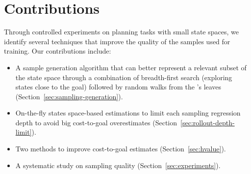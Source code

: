 \section{Contributions}
\label{sec:contributions}

Through controlled experiments on planning tasks with small state spaces, we identify several techniques that improve the quality of the samples used for training. Our contributions include:

\begin{itemize}
    \item A sample generation algorithm that can better represent a relevant subset of the state space through a combination of breadth-first search (exploring states close to the goal) followed by random walks from the \bfs's leaves (Section~\ref{sec:sampling-generation}).
    \item On-the-fly states space-based estimations to limit each sampling regression depth to avoid big cost-to-goal overestimates (Section~\ref{sec:rollout-depth-limit}).
    \item Two methods to improve cost-to-goal estimates (Section~\ref{sec:hvalue}).
    \item A systematic study on sampling quality (Section~\ref{sec:experiments}).
\end{itemize}
